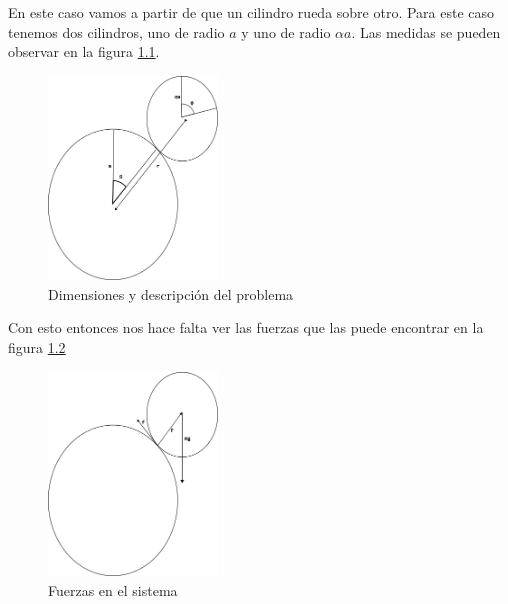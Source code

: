 \documentclass{report}
\begin{document}
\chapter{}

En este caso vamos a partir de que un cilindro rueda sobre otro. Para este caso tenemos dos cilindros, uno de radio $a$  y uno de radio $\alpha a$. Las medidas se pueden observar en la figura \ref{fig:img-pregunta_3_1-png}. 

\begin{figure}[H]
  \centering
  \includegraphics[width=0.4\textwidth]{img/pregunta_3_1.png}
  \caption{Dimensiones y descripción del problema}
  \label{fig:img-pregunta_3_1-png}
\end{figure}

Con esto entonces nos hace falta ver las fuerzas que las puede encontrar en la figura \ref{fig:img-pregunta_3_2-png}

\begin{figure}[H]
  \centering
  \includegraphics[width=0.4\textwidth]{img/pregunta_3_2.png}
  \caption{Fuerzas en el sistema}
  \label{fig:img-pregunta_3_2-png}
\end{figure}
\end{document}
